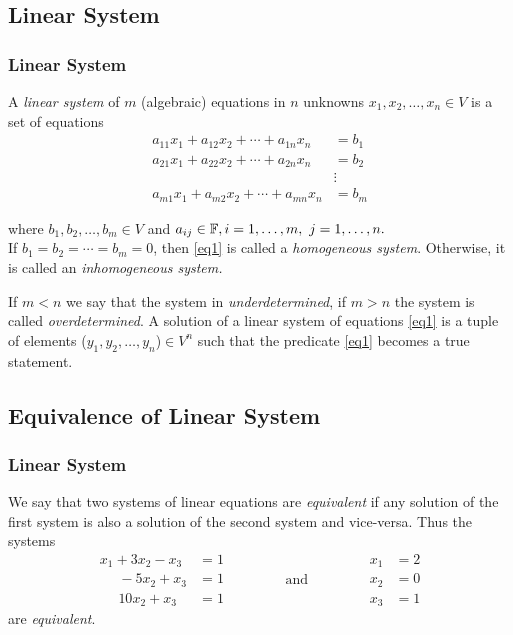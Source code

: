 \documentclass{beamer}
\renewcommand{\emph}[1]{{\color{Turquoise3}\textsl{#1}}}
\newcommand{\myseries}[2]{$#1_1,#1_2,\dots,#1_#2$}
\begin{document}
\subsection{Linear System}
\begin{frame}
    \frametitle{Linear System}

    A \emph{linear system} of $m$ (algebraic) equations in $n$ unknowns \myseries{x}{n}$\in V$ is a set of equations
    \begin{equation}
        \begin{aligned}
            a_{11}x_1+a_{12}x_2+\cdots+a_{1n}x_n & =b_1   \\
            a_{21}x_1+a_{22}x_2+\cdots+a_{2n}x_n & =b_2   \\
                                                 & \vdots \\
            a_{m1}x_1+a_{m2}x_2+\cdots+a_{mn}x_n & =b_m
        \end{aligned}
        \label{eq1}
    \end{equation}

    where \myseries{b}{m}$\in V$ and $a_{ij}\in\mathbb{F},i=1,\ldots,m,~j=1,\ldots,n.$\\
    If $b_1=b_2=\cdots=b_m=0$, then \eqref{eq1} is called a \emph{homogeneous system}. Otherwise, it is called an \emph{inhomogeneous system.}

    If $m<n$ we say that the system in \emph{underdetermined}, if $m>n$ the system is called \emph{overdetermined}.
    A solution of a linear system of equations \eqref{eq1} is a tuple of elements (\myseries{y}{n})$\in V^n$ such that the predicate \eqref{eq1} becomes a true statement.\\[3pt]
\end{frame}

\subsection{Equivalence of Linear System}
\begin{frame}
    \frametitle{Linear System}
    We say that two systems of linear equations are \emph{equivalent} if any solution
    of the first system is also a solution of the second system and vice-versa.
    Thus the systems
    \begin{equation*}
        \begin{aligned}
            x_1+3x_2-x_3    & =1 \\
            ~~~~~~-5x_2+x_3 & =1 \\
            ~~~~~~10x_2+x_3 & =1
        \end{aligned}
        \qquad\qquad\text{and}\qquad\qquad
        \begin{aligned}
            x_1 & =2 \\x_2&=0\\x_3&=1
        \end{aligned}
    \end{equation*} are \emph{equivalent}.
\end{frame}
\end{document}
